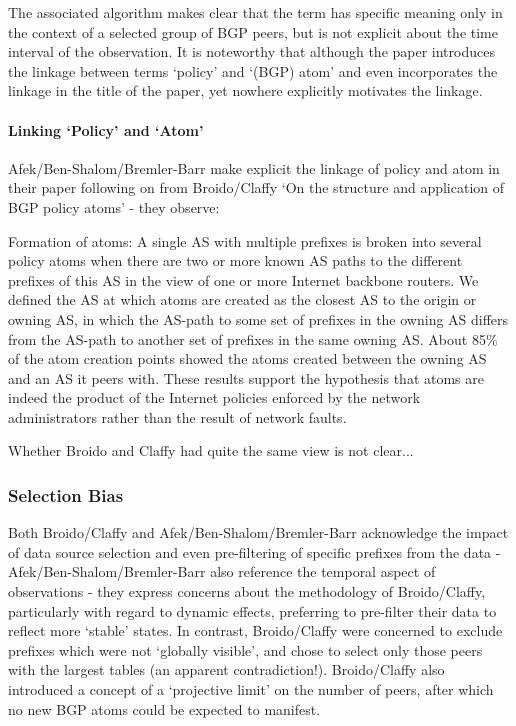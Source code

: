 The associated algorithm makes clear that the term has specific meaning only in the context of a selected group of BGP peers, but is not explicit about the time interval of the observation. It is noteworthy that although the paper introduces the linkage between terms `policy' and `(BGP) atom' and even incorporates the linkage in the title of the paper, yet nowhere explicitly motivates the linkage.

\paragraph{Linking `Policy' and `Atom'}

Afek/Ben-Shalom/Bremler-Barr make explicit the linkage of policy and atom in their paper \cite{Afek2002} following on from Broido/Claffy `On the structure and application of BGP policy atoms' - they observe:

Formation of atoms: A single AS with multiple prefixes is broken into several policy atoms when there are two or more known AS paths to the different prefixes of this AS in the view of one or more Internet backbone routers. We defined the AS at which atoms are created as the closest AS to the origin or owning AS, in which the AS-path to some set of prefixes in the owning AS differs from the AS-path to another set of prefixes in the same owning AS. About 85\% of the atom creation points showed the atoms created between the owning AS and an AS it peers with. These results support the hypothesis that atoms are indeed the product of the Internet policies enforced by the network administrators rather than the result of network faults.

Whether Broido and Claffy had quite the same view is not clear...

\subsubsection{Selection Bias}

Both Broido/Claffy and Afek/Ben-Shalom/Bremler-Barr acknowledge the impact of data source selection and even pre-filtering of specific prefixes from the data - Afek/Ben-Shalom/Bremler-Barr also reference the temporal aspect of observations - they express concerns about the methodology of Broido/Claffy, particularly with regard to dynamic effects, preferring to pre-filter their data to reflect more `stable' states. In contrast, Broido/Claffy were concerned to exclude prefixes which were not `globally visible', and chose to select only those peers with the largest tables (an apparent contradiction!). Broido/Claffy also introduced a concept of a `projective limit' on the number of peers, after which no new BGP atoms could be expected to manifest.

